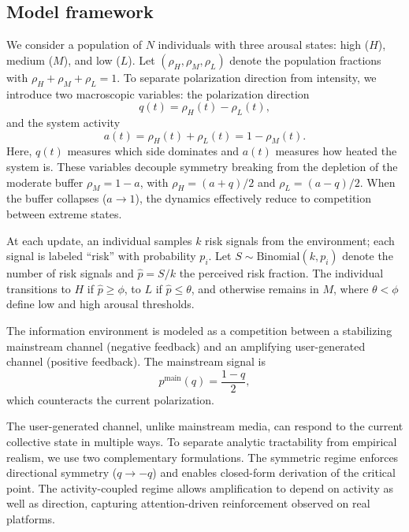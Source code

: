 \documentclass[11pt]{article}
\begin{document}
\subsection{Model framework}
We consider a population of $N$ individuals with three arousal states: high ($H$), medium ($M$), and low ($L$). Let $(\rho_H,\rho_M,\rho_L)$ denote the population fractions with $\rho_H+\rho_M+\rho_L=1$. To separate polarization direction from intensity, we introduce two macroscopic variables: the polarization direction
\begin{equation}
q(t)=\rho_H(t)-\rho_L(t),
\label{eq:q}
\end{equation}
and the system activity
\begin{equation}
a(t)=\rho_H(t)+\rho_L(t)=1-\rho_M(t).
\label{eq:a}
\end{equation}
Here, $q(t)$ measures which side dominates and $a(t)$ measures how heated the system is. These variables decouple symmetry breaking from the depletion of the moderate buffer $\rho_M=1-a$, with $\rho_H=(a+q)/2$ and $\rho_L=(a-q)/2$. When the buffer collapses ($a\to 1$), the dynamics effectively reduce to competition between extreme states.

At each update, an individual samples $k$ risk signals from the environment; each signal is labeled ``risk'' with probability $p_i$. Let $S\sim\text{Binomial}(k,p_i)$ denote the number of risk signals and $\hat{p}=S/k$ the perceived risk fraction. The individual transitions to $H$ if $\hat{p}\ge\phi$, to $L$ if $\hat{p}\le\theta$, and otherwise remains in $M$, where $\theta<\phi$ define low and high arousal thresholds.

The information environment is modeled as a competition between a stabilizing mainstream channel (negative feedback) and an amplifying user-generated channel (positive feedback). The mainstream signal is
\begin{equation}
p^{\text{main}}(q)=\frac{1-q}{2},
\label{eq:pmain}
\end{equation}
which counteracts the current polarization.

The user-generated channel, unlike mainstream media, can respond to the current collective state in multiple ways. To separate analytic tractability from empirical realism, we use two complementary formulations. The symmetric regime enforces directional symmetry ($q\to -q$) and enables closed-form derivation of the critical point. The activity-coupled regime allows amplification to depend on activity as well as direction, capturing attention-driven reinforcement observed on real platforms.
\end{document}
